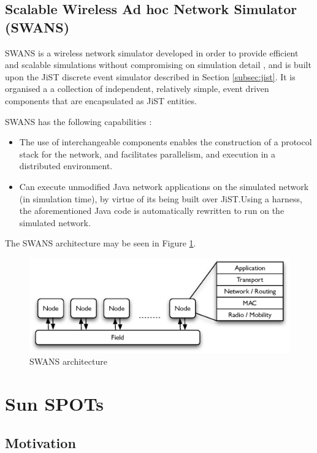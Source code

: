 \subsection{Scalable Wireless Ad hoc Network Simulator (SWANS)}
SWANS is a wireless network simulator developed in order to provide efficient
and scalable simulations without compromising on simulation detail \cite{barr_SWANS},
and is built upon the JiST discrete event simulator described in Section \ref{subsec:jist}. 
It is organised a a collection of independent, relatively simple, event driven
components that are encapsulated as JiST entities. 
  
SWANS has the following capabilities \cite{barr_SWANS}:

\begin{itemize}
\item The use of
interchangeable components enables the construction of a protocol stack for the
network, and facilitates parallelism, and execution in a distributed environment.
\item Can execute unmodified Java network applications on the
simulated network (in simulation time), by virtue of its being built over
JiST.Using a harness, the aforementioned Java code is automatically rewritten to
run on the simulated network.  
\end{itemize}
   
The SWANS architecture may be seen in Figure \ref{Fig:SWANS_architecture}. 

\begin{figure}[ht]
\centering
\label{Fig:SWANS_architecture}
\includegraphics[scale=0.71]{img/SWANS_architecture.eps} \caption[SWANS 
architecture]{SWANS architecture}
\end{figure} 

\section {Sun SPOTs} \label{sec:sunspots}

\subsection{Motivation}

